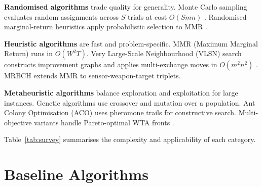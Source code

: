 \documentclass[10pt,conference]{IEEEtran}
\begin{document}
\textbf{Randomised algorithms} trade quality for generality.
Monte Carlo sampling evaluates random assignments across $S$ trials at cost
$O(Smn)$ \cite{kline2020}.  Randomised marginal-return heuristics apply
probabilistic selection to MMR \cite{sonuc2020}.

\textbf{Heuristic algorithms} are fast and problem-specific.
MMR (Maximum Marginal Return) \cite{ahuja2007,xin2018} runs in $O(W^2 T)$.
Very Large-Scale Neighbourhood (VLSN) search constructs improvement graphs and
applies multi-exchange moves in $O(m^2 n^2)$ \cite{ahuja2007}.
MRBCH \cite{xin2018} extends MMR to sensor-weapon-target triplets.

\textbf{Metaheuristic algorithms} balance exploration and exploitation for
large instances.  Genetic algorithms \cite{bogdanowicz2013,kline2020} use
crossover and mutation over a population.  Ant Colony Optimisation (ACO)
\cite{lee2003,lee2002,hu2018} uses pheromone trails for constructive search.
Multi-objective variants handle Pareto-optimal WTA fronts \cite{li2017}.

Table~\ref{tab:survey} summarises the complexity and applicability of each
category.

\begin{table}[htbp]
  \caption{Algorithm Category Comparison for WTA}
  \label{tab:survey}
  \centering
  \small
  \setlength{\tabcolsep}{4pt}
  \renewcommand{\arraystretch}{1.08}
\end{table}

\section{Baseline Algorithms}
\label{sec:baselines}
\end{document}
